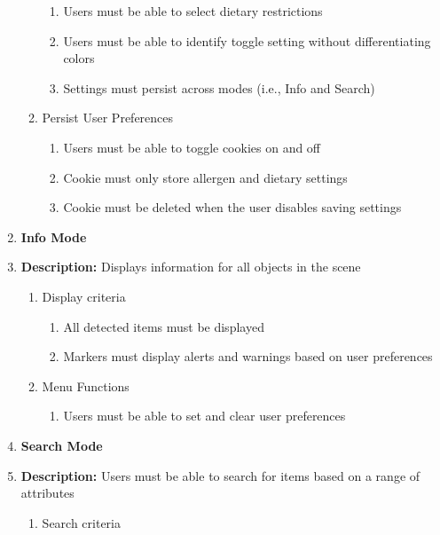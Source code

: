 \documentclass[thesis]{fputhesis}
\begin{document}
\begin{body}
\begin{enumerate}
\begin{enumerate}
        \begin{enumerate}
            \item[\textbullet] Users must be able to select dietary restrictions
            \item[\textbullet] Users must be able to identify toggle setting without differentiating colors
            \item[\textbullet] Settings must persist across modes (i.e., Info and Search)
        \end{enumerate}
        \item[\textbullet] Persist User Preferences
        \begin{enumerate}
            \item[\textbullet] Users must be able to toggle cookies on and off
            \item[\textbullet] Cookie must only store allergen and dietary settings
            \item[\textbullet] Cookie must be deleted when the user disables saving settings
        \end{enumerate}
    \end{enumerate}
    \item \textbf{Info Mode}
    \item[] \textbf{Description:} Displays information for all objects in the scene
    \begin{enumerate}
        \item[\textbullet] Display criteria
        \begin{enumerate}
            \item[\textbullet] All detected items must be displayed
            \item[\textbullet] Markers must display alerts and warnings based on user preferences
        \end{enumerate}
        \item[\textbullet] Menu Functions
        \begin{enumerate}
            \item[\textbullet] Users must be able to set and clear user preferences
        \end{enumerate}
    \end{enumerate}
    \item \textbf{Search Mode}
    \item[] \textbf{Description:} Users must be able to search for items based on a range of attributes
    \begin{enumerate}
        \item[\textbullet] Search criteria

\end{enumerate}
\end{enumerate}
\end{body}
\end{document}
